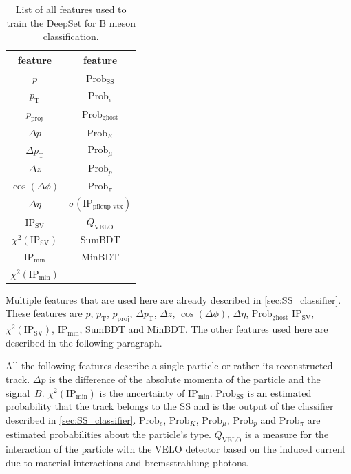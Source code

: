 \begin{table}
    \centering
    \caption{List of all features used to train the DeepSet for B meson classification.}
    \label{tab:B_features}
    \begin{tabular}{c c}
        \toprule
        feature & feature \\
        \midrule
        $p$                 & $\text{Prob}_\text{SS}$ \\ %
        $p_\text{T}$        & $\text{Prob}_e$ \\ %
        $p_\text{proj}$     & $\text{Prob}_\text{ghost}$ \\ %
        $\Delta p$          & $\text{Prob}_K$ \\ %
        $\Delta p_\text{T}$ & $\text{Prob}_\mu$ \\ %
        $\Delta z$          & $\text{Prob}_p$ \\ %
        $\cos(\Delta \phi)$ & $\text{Prob}_\pi$ \\ %
        $\Delta \eta$       & $\sigma(\text{IP}_\text{pileup vtx})$ \\ %
        $\text{IP}_\text{SV}$        & $Q_\text{VELO}$ \\ %
        $\chi^2(\text{IP}_\text{SV})$    & SumBDT \\ %
        $\text{IP}_\text{min}$               & MinBDT \\ %
        $\chi^2(\text{IP}_\text{min})$           & \\ %
        \bottomrule
    \end{tabular}
\end{table}

Multiple features that are used here are already described in \cref{sec:SS_classifier}.
These features are 
$p$,
$p_\text{T}$, 
$p_\text{proj}$, 
$\Delta p_\text{T}$, 
$\Delta z$, 
$\cos(\Delta \phi)$, 
$\Delta \eta$, 
$\text{Prob}_\text{ghost}$
$\text{IP}_\text{SV}$, 
$\chi^2(\text{IP}_\text{SV})$, 
$\text{IP}_\text{min}$,        
SumBDT and
MinBDT.
The other features used here are described in the following paragraph.

All the following features describe a single particle or rather its reconstructed track.
$\Delta p$ is the difference of the absolute momenta of the particle and the signal~$B$.
$\chi^2(\text{IP}_\text{min})$ is the uncertainty of $\text{IP}_\text{min}$.
%
$\text{Prob}_\text{SS}$ is an estimated probability that the track belongs to the SS and is the output of the classifier described in \cref{sec:SS_classifier}. 
$\text{Prob}_e$, 
$\text{Prob}_K$, 
$\text{Prob}_\mu$, 
$\text{Prob}_p$ and 
$\text{Prob}_\pi$ are estimated probabilities about the particle's type.
%
$Q_\text{VELO}$ is a measure for the interaction of the particle with the VELO detector based on the induced current due to material interactions and bremsstrahlung photons.


